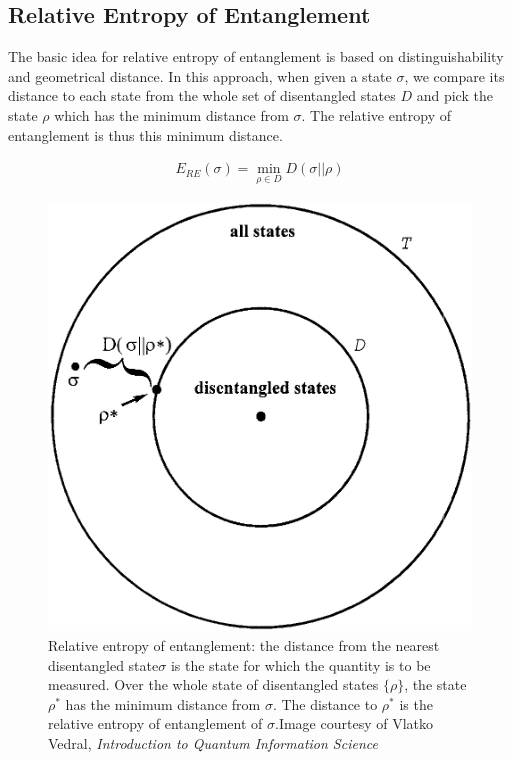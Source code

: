 \subsection{Relative Entropy of Entanglement}
\par The basic idea for relative entropy of entanglement is based on distinguishability and geometrical distance. In this approach, when given a state $\sigma$, we compare its distance to each state from the whole set of disentangled states $D$ and pick the state $\rho$ which has the minimum distance from $\sigma$. The relative entropy of entanglement is thus this minimum distance.

\begin{align*}
E_{RE}(\sigma) = \underset{\rho \in D}{\min}  D(\sigma||\rho)
\end{align*}

\begin{figure}[h]
  \begin{center}
    \includegraphics[scale=0.25]{figures/entanglement-distance.png}
    \caption{Relative entropy of entanglement: the distance from the nearest disentangled state\newline $\sigma$ is the state for which the quantity is to be measured. Over the whole state of disentangled states $\{\rho\}$, the state $\rho^*$ has the minimum distance from $\sigma$. The distance to $\rho^*$ is the relative entropy of entanglement of $\sigma$.\newline Image courtesy of Vlatko Vedral, \textit{Introduction to Quantum Information Science} \cite{vedralqitbook}}
    \label{fig: Relative Entropy of Entanglement}
  \end{center}
\end{figure}

